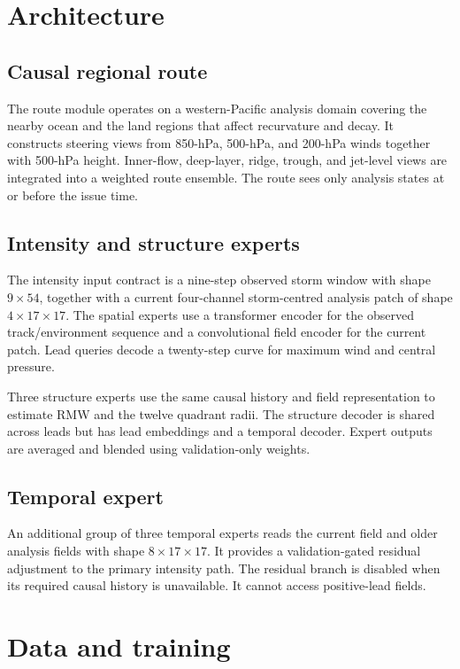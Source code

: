 \documentclass[11pt]{article}
\begin{document}
\section{Architecture}

\subsection{Causal regional route}

The route module operates on a western-Pacific analysis domain covering the
nearby ocean and the land regions that affect recurvature and decay.  It
constructs steering views from 850-hPa, 500-hPa, and 200-hPa winds together
with 500-hPa height.  Inner-flow, deep-layer, ridge, trough, and jet-level
views are integrated into a weighted route ensemble.  The route sees only
analysis states at or before the issue time.

\subsection{Intensity and structure experts}

The intensity input contract is a nine-step observed storm window with shape
\(9\times54\), together with a current four-channel storm-centred analysis
patch of shape \(4\times17\times17\).  The spatial experts use a transformer
encoder for the observed track/environment sequence and a convolutional
field encoder for the current patch.  Lead queries decode a twenty-step
curve for maximum wind and central pressure.

Three structure experts use the same causal history and field representation
to estimate RMW and the twelve quadrant radii.  The structure decoder is
shared across leads but has lead embeddings and a temporal decoder.  Expert
outputs are averaged and blended using validation-only weights.

\subsection{Temporal expert}

An additional group of three temporal experts reads the current field and
older analysis fields with shape \(8\times17\times17\).  It provides a
validation-gated residual adjustment to the primary intensity path.  The
residual branch is disabled when its required causal history is unavailable.
It cannot access positive-lead fields.

\section{Data and training}
\end{document}
